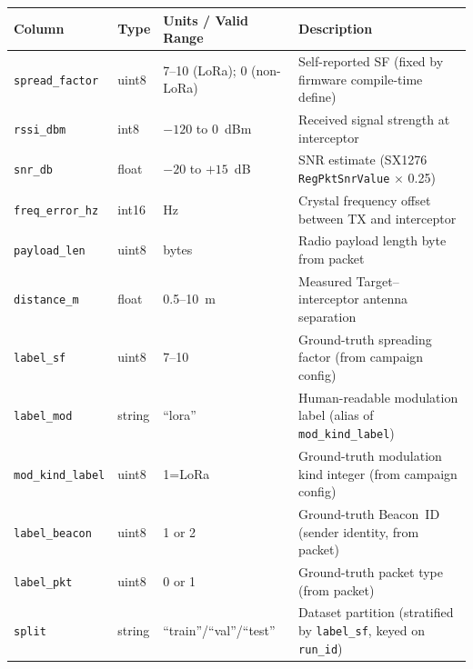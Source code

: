 \documentclass[11pt,letterpaper]{article}
\begin{document}
\newpage

\begin{tabularx}{\textwidth}{l l l X}
	\toprule
	\textbf{Column} & \textbf{Type} & \textbf{Units / Valid Range} & \textbf{Description} \\
	\midrule
	\texttt{spread\_factor} & uint8 & 7--10 (LoRa); 0 (non-LoRa) & Self-reported SF (fixed by firmware compile-time define) \\
	\texttt{rssi\_dbm} & int8 & $-120$ to $0$~dBm & Received signal strength at interceptor \\
	\texttt{snr\_db} & float & $-20$ to $+15$~dB & SNR estimate (SX1276 \texttt{RegPktSnrValue} $\times$ 0.25) \\
	\texttt{freq\_error\_hz} & int16 & Hz & Crystal frequency offset between TX and interceptor \\
	\texttt{payload\_len} & uint8 & bytes & Radio payload length byte from packet \\
	\texttt{distance\_m} & float & 0.5--10~m & Measured Target--interceptor antenna separation \\
	\texttt{label\_sf} & uint8 & 7--10 & Ground-truth spreading factor (from campaign config) \\
	\texttt{label\_mod} & string & ``lora'' & Human-readable modulation label (alias of \texttt{mod\_kind\_label}) \\
	\texttt{mod\_kind\_label} & uint8 & 1=LoRa & Ground-truth modulation kind integer (from campaign config) \\
	\texttt{label\_beacon} & uint8 & 1 or 2 & Ground-truth Beacon~ID (sender identity, from packet) \\
	\texttt{label\_pkt} & uint8 & 0 or 1 & Ground-truth packet type (from packet) \\
	\texttt{split} & string & ``train''/``val''/``test'' & Dataset partition (stratified by \texttt{label\_sf}, keyed on \texttt{run\_id}) \\
	\bottomrule
\end{tabularx}
\end{document}
